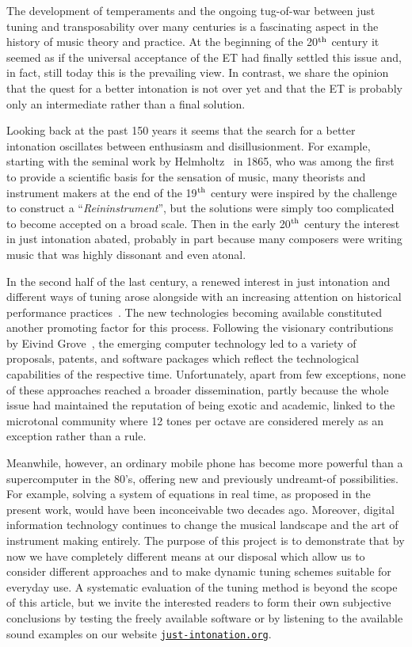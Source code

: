  
The development of temperaments and the ongoing tug-of-war between just tuning and transposability over many centuries is a fascinating aspect in the history of music theory and practice. At the beginning of the 20$^{\rm th}$ century it seemed as if the universal acceptance of the ET had finally settled this issue and, in fact, still today this is the prevailing view. In contrast, we share the opinion that the quest for a better intonation is not over yet and that the ET is probably only an intermediate rather than a final solution.

Looking back at the past 150 years it seems that the search for a better intonation oscillates between enthusiasm and disillusionment. For example, starting with the seminal work by Helmholtz~\cite{helmholtz} in 1865, who was among the first to provide a scientific basis for the sensation of music, many theorists and instrument makers at the end of the 19$^{\rm th}$ century were inspired by the challenge to construct a ``\textit{Reininstrument}'', but the solutions were simply too complicated to become accepted on a broad scale. Then in the early 20$^{\rm th}$ century the interest in just intonation abated, probably in part because many composers were writing music that was highly dissonant and even atonal.

In the second half of the last century, a  renewed interest in just intonation and different ways of tuning arose alongside with an increasing attention on historical performance practices~\cite{DuffinArticle}. The new technologies becoming available constituted  another promoting factor for this process. Following the visionary contributions by Eivind Grove~\cite{GrovenMax}, the emerging computer technology led to a variety of proposals, patents, and software packages which reflect the technological capabilities of the respective time. Unfortunately, apart from few exceptions, none of these approaches reached a broader dissemination, partly because the whole issue had maintained the reputation of being exotic and academic, linked to the microtonal community where 12 tones per octave are considered merely as an exception rather than a rule. 

Meanwhile, however, an ordinary mobile phone has become more powerful than a supercomputer in the 80's, offering new and previously undreamt-of possibilities. For example, solving a system of equations in real time, as proposed in the present work, would have been inconceivable two decades ago. Moreover, digital information technology continues to change the musical landscape and the art of instrument making entirely. The purpose of this project is to demonstrate that by now we have completely different means at our disposal which allow us to consider different approaches and to make dynamic tuning schemes suitable for everyday use.  A systematic evaluation of the tuning method is beyond the scope of this article, but we invite the interested readers to form their own subjective conclusions by testing the freely available software or by listening to the available sound examples on our website \href{http://www.just-intonation.org}{\texttt{just-intonation.org}}.

